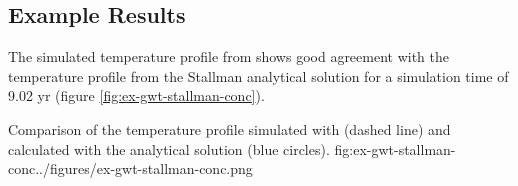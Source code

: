 

\subsection{Example Results}

The simulated temperature profile from \mf shows good agreement with the temperature profile from the Stallman analytical solution for a simulation time of 9.02 yr (figure \ref{fig:ex-gwt-stallman-conc}).  

\begin{StandardFigure}{
                                     Comparison of the temperature profile simulated with \mf (dashed line) and calculated with the \cite{stallman1965steady} analytical solution (blue circles).
                                     }{fig:ex-gwt-stallman-conc}{../figures/ex-gwt-stallman-conc.png}
\end{StandardFigure}